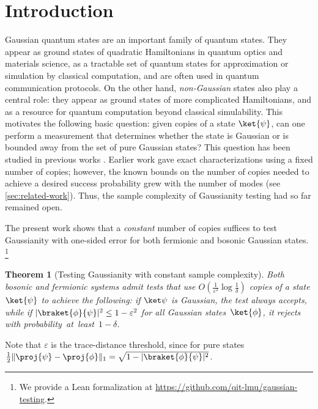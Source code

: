 \documentclass[11pt,a4paper]{article}
\newtheorem{theorem}{Theorem}[section]
\numberwithin{equation}{section}
\newcommand{\eps}{\varepsilon}
\newcommand{\1}{\mathbf{1}}
\DeclarePairedDelimiter\abs{\lvert}{\rvert}
\DeclarePairedDelimiter\norm{\lVert}{\rVert}
\begin{document}
\section{Introduction}
Gaussian quantum states are an important family of quantum states.
They appear as ground states of quadratic Hamiltonians in quantum optics and materials science, as a tractable set of quantum states for approximation or simulation by classical computation, and are often used in quantum communication protocols.
On the other hand, \emph{non-Gaussian} states also play a central role: they appear as ground states of more complicated Hamiltonians, and as a resource for quantum computation beyond classical simulability.
This motivates the following basic question: given copies of a state $\ket{\psi}$, can one perform a measurement that determines whether the state is Gaussian or is bounded away from the set of pure Gaussian states?
This question has been studied in previous works \cite{lyu2024fermionic,bu2025efficient,tarabunga2026fermionic,girardi2025gaussian}.
Earlier work gave exact characterizations using a fixed number of copies; however, the known bounds on the number of copies needed to achieve a desired success probability grew with the number of modes (see \cref{sec:related-work}).
Thus, the sample complexity of Gaussianity testing had so far remained open.

The present work shows that a \emph{constant} number of copies suffices to test Gaussianity with one-sided error for both fermionic and bosonic Gaussian states.%
\footnote{We provide a Lean formalization at \url{https://github.com/qit-lmu/gaussian-testing}.}

\begin{theorem}[Testing Gaussianity with constant sample complexity]\label{thm:main-intro}
    Both bosonic and fermionic systems admit tests that use $O(\frac{1}{\eps^2}\log\frac{1}{\delta})$ copies of a state $\ket{\psi}$ to achieve the following:
    if $\ket\psi$ is Gaussian, the test always accepts,
    while if $\abs{\braket{\phi}{\psi}}^2 \leq 1 - \eps^2$ for all Gaussian states~$\ket{\phi}$, it rejects with probability~at~least~$1-\delta$.
\end{theorem}

\noindent
Note that $\eps$ is the trace-distance threshold, since for pure states $\tfrac12\norm{\proj{\psi}-\proj{\phi}}_1=\sqrt{1-\abs{\braket{\phi}{\psi}}^2}$.
\end{document}
